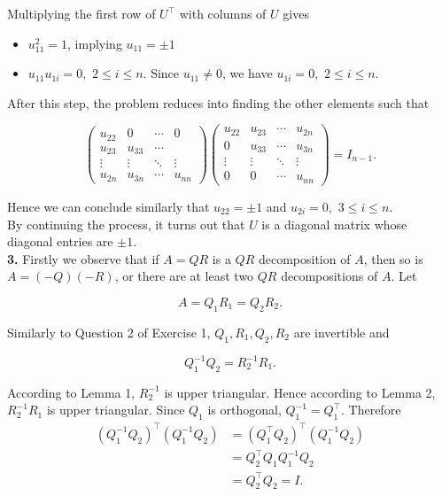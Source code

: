 Multiplying the first row of $U^\top$ with columns of $U$ gives

\begin{itemize}
 \renewcommand{\labelitemi}{\scriptsize$\blacksquare$}
 \item $u^2_{11}=1$, implying $u_{11}=\pm 1$
 \item $u_{11}u_{1i}=0,\,\, 2\le i\le n$. Since $u_{11}\ne 0$, we have $u_{1i}=0,\,\, 2\le i\le n$.
\end{itemize}

After this step, the problem reduces into finding the other elements such that

$$\begin{pmatrix}
    u_{22} & 0  & \cdots & 0\\
    u_{23} & u_{33} & \cdots & \\
    \vdots & \vdots & \ddots & \vdots\\
    u_{2n} &  u_{3n} &   \cdots    & u_{nn}
\end{pmatrix}
\begin{pmatrix}
    u_{22} & u_{23} & \cdots & u_{2n}\\
    0      & u_{33} & \cdots & u_{3n}\\
    \vdots & \vdots & \ddots & \vdots\\
    0      &  0     & \cdots & u_{nn}
\end{pmatrix}=I_{n-1}.$$

Hence we can conclude similarly that $u_{22}=\pm 1$ and $u_{2i}=0,\,\, 3\le i\le n$. \\

By continuing the process, it turns out that $U$ is a diagonal matrix whose diagonal entries are $\pm 1$.\\

\textbf{3. } Firstly we observe that if $A=QR$ is a $QR$ decomposition of $A$, then so is $A=(-Q)(-R)$, or there are at least two $QR$ decompositions of $A$. Let

$$A=Q_1R_1=Q_2R_2.$$

Similarly to Question 2 of Exercise 1, $Q_1,R_1,Q_2,R_2$ are invertible and

$$Q_1^{-1}Q_2=R_2^{-1}R_1.$$

According to Lemma 1, $R_2^{-1}$ is upper triangular. Hence according to Lemma 2, $R_2^{-1}R_1$ is upper triangular. Since $Q_1$ is orthogonal, $Q_1^{-1}=Q_1^\top$. Therefore
\begin{align*}
    (Q_1^{-1}Q_2)^\top(Q_1^{-1}Q_2)
    &=(Q_1^\top Q_2)^\top(Q_1^{-1}Q_2)\\
    &=Q_2^\top Q_1Q_1^{-1} Q_2 \\
    &= Q_2^\top Q_2= I.
\end{align*}

